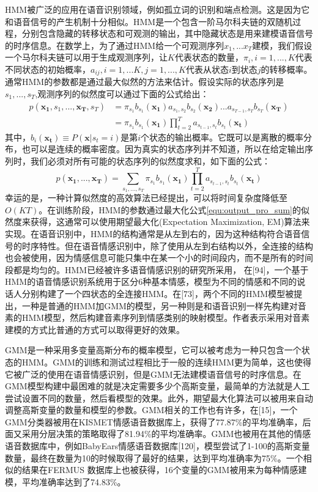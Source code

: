 HMM被广泛的应用在语音识别领域，例如孤立词的识别和端点检测。这是因为它和语音信号的产生机制十分相似。HMM是一个包含一阶马尔科夫链的双随机过程，分别包含隐藏的转移状态和可观测的输出，其中隐藏状态是用来建模语音信号的时序信息。在数学上，为了通过HMM给一个可观测序列$x_1,...x_T$建模，我们假设一个马尔科夫链可以用于生成观测序列，让$K$代表状态的数量，$\pi_i, i=1,...,K$代表不同状态的初始概率，$a_{ij}, i=1,...K, j=1,...,K$代表从状态$i$到状态$j$的转移概率。通常HMM的参数都是通过最大似然的方法来估计。假设实际的状态序列是$s_1,...,s_T$,观测序列的似然度可以通过下面的公式给出：
\begin{equation}
\label{equ:output_pro}
    \begin{aligned}
        p(\mathbf{x_1},s_1,...,\mathbf{x_T},s_T) &= \pi_{s_1}b_{s_1}(\mathbf{x_1})a_{s_1,s_2}b_{s_2}(\mathbf{x_2})...a_{s_{T-1},s_T}b_{s_T}(\mathbf{x_T}) \\
        &= \pi_{s_1}b_{s_1}(\mathbf{x_1})\prod\limits_{t=2}^Ta_{s_{t-1},s_t}b_{s_t}(\mathbf{x_t})
    \end{aligned}
\end{equation}
其中，$b_i(\mathbf{x_t}) \equiv P(\mathbf{x}|s_t = i)$是第$i$个状态的输出概率。它既可以是离散的概率分布，也可以是连续的概率密度。因为真实的状态序列并不知道，所以在给定输出序列时，我们必须对所有可能的状态序列的似然度求和，如下面的公式：
\begin{equation}
\label{equ:output_pro_sum}
        p(\mathbf{x_1},...,\mathbf{x_T}) = \sum\limits_{s_1,...,s_T}\pi_{s_1}b_{s_1}(\mathbf{x_1})\prod\limits_{t=2}^Ta_{s_{t-1},s_t}b_{s_t}(\mathbf{x_t})
\end{equation}
幸运的是，一种计算似然度的高效算法已经提出，可以将时间复杂度降低至$O(KT)$。在训练阶段，HMM的参数通过最大化公式\ref{equ:output_pro_sum}的似然度来获得，这通常可以使用期望最大化(Expectation Maximization, EM)算法来实现。在语音识别中，HMM的结构通常是从左到右的，因为这种结构符合语音信号的时序特性。但在语音情感识别中，除了使用从左到右结构以外，全连接的结构也会被使用，因为情感信息可能只集中在某一个小的时间段内，而不是所有的时间段都是均匀的。HMM已经被许多语音情感识别的研究所采用， 在[94]，一个基于HMM的语音情感识别系统用于区分6种基本情感，模型为不同的情感和不同的说话人分别构建了一个四状态的全连接HMM。在[73]，两个不同的HMM模型被提出，一种是普通的HMM加GMM的模型，另一种则是和语音识别一样先构建对音素的HMM模型，然后构建音素序列到情感类别的映射模型。作者表示采用对音素建模的方式比普通的方式可以取得更好的效果。

GMM是一种采用多变量高斯分布的概率模型，它可以被考虑为一种只包含一个状态的HMM。GMM的训练和测试过程相比于一般的连续HMM更为简单，这也使得它被广泛的使用在语音情感识别，但是GMM无法建模语音信号的时序信息。在GMM模型构建中最困难的就是决定需要多少个高斯变量，最简单的方法就是人工尝试设置不同的数量，然后看模型的效果。此外，期望最大化算法可以被用来自动调整高斯变量的数量和模型的参数。GMM相关的工作也有许多，在[15]，一个GMM分类器被用在KISMET情感语音数据库上，获得了77.87\%的平均准确率，后面又采用分层决策的策略取得了81.94\%的平均准确率。GMM也被用在其他的情感语音数据库中，例如BabyEars情感语音数据库[120]，模型尝试了1-100的高斯变量数量，最终在数量为10的时候取得了最好的结果，达到平均准确率为75\%。一个相似的结果在FERMUS \uppercase\expandafter{}数据库上也被获得，16个变量的GMM被用来为每种情感建模，平均准确率达到了74.83\%。


